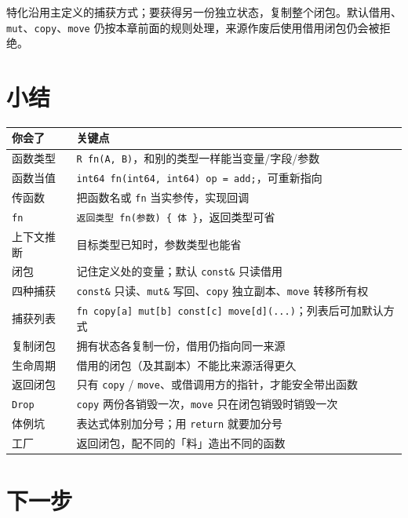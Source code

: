 特化沿用主定义的捕获方式；要获得另一份独立状态，复制整个闭包。默认借用、\texttt{mut}、\texttt{copy}、\texttt{move} 仍按本章前面的规则处理，来源作废后使用借用闭包仍会被拒绝。

\section{小结}

\begin{center}
\begin{tabular}{ll}
\toprule
你会了 & 关键点 \\
\midrule
函数类型 & \texttt{R fn(\allowbreak{}A,\allowbreak{} B)\allowbreak{}}，和别的类型一样能当变量/字段/参数 \\
函数当值 & \texttt{int64 fn(\allowbreak{}int64,\allowbreak{} int64)\allowbreak{} op =\allowbreak{} add;}，可重新指向 \\
传函数 & 把函数名或 \texttt{fn} 当实参传，实现回调 \\
\texttt{fn} & \texttt{返回类型 fn(\allowbreak{}参数)\allowbreak{} \{ 体 \}}，返回类型可省 \\
上下文推断 & 目标类型已知时，参数类型也能省 \\
闭包 & 记住定义处的变量；默认 \texttt{const\&} 只读借用 \\
四种捕获 & \texttt{const\&} 只读、\texttt{mut\&} 写回、\texttt{copy} 独立副本、\texttt{move} 转移所有权 \\
捕获列表 & \texttt{fn copy[\allowbreak{}a]\allowbreak{} mut[\allowbreak{}b]\allowbreak{} const[\allowbreak{}c]\allowbreak{} move[\allowbreak{}d]\allowbreak{}(\allowbreak{}.\allowbreak{}.\allowbreak{}.\allowbreak{})\allowbreak{}}；列表后可加默认方式 \\
复制闭包 & 拥有状态各复制一份，借用仍指向同一来源 \\
生命周期 & 借用的闭包（及其副本）不能比来源活得更久 \\
返回闭包 & 只有 \texttt{copy} / \texttt{move}、或借调用方的指针，才能安全带出函数 \\
\texttt{Drop} & \texttt{copy} 两份各销毁一次，\texttt{move} 只在闭包销毁时销毁一次 \\
体例坑 & 表达式体别加分号；用 \texttt{return} 就要加分号 \\
工厂 & 返回闭包，配不同的「料」造出不同的函数 \\
\bottomrule
\end{tabular}
\end{center}

\section{下一步}

